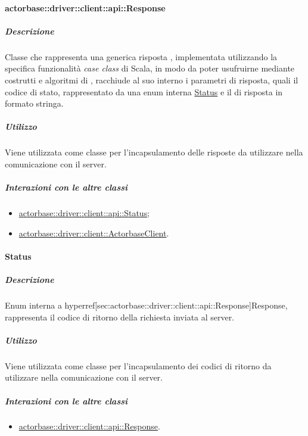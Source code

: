 \documentclass{scalatekids-article}
\begin{document}
\paragraph{actorbase::driver::client::api::Response}
\label{sec:actorbase::driver::client::api::Response}

\subparagraph{Descrizione}

Classe che rappresenta una generica risposta , implementata
utilizzando la specifica funzionalità \textit{case class} di Scala, in modo da
poter usufruirne mediante costrutti e algoritmi di ,
racchiude al suo interno i parametri di risposta, quali il codice di stato,
rappresentato da una enum interna
\hyperref[sec:actorbase::driver::client::api::Status]{Status} e il
 di risposta in formato stringa.

\subparagraph{Utilizzo}

Viene utilizzata come classe per l'incapsulamento delle risposte  da
utilizzare nella comunicazione con il server.

\subparagraph{Interazioni con le altre classi}

\begin{itemize}
\item \hyperref[sec:actorbase::driver::client::api::Status]{actorbase::driver::client::api::Status};
\item \hyperref[sec:actorbase::driver::client::ActorbaseClient]{actorbase::driver::client::ActorbaseClient}.
\end{itemize}


\paragraph{Status}
\label{sec:actorbase::driver::client::api::Status}

\subparagraph{Descrizione}

Enum interna a hyperref[sec:actorbase::driver::client::api::Response]{Response},
rappresenta il codice di ritorno della richiesta  inviata al server.

\subparagraph{Utilizzo}

Viene utilizzata come classe per l'incapsulamento dei codici di ritorno
 da utilizzare nella comunicazione con il server.

\subparagraph{Interazioni con le altre classi}

\begin{itemize}
\item \hyperref[sec:actorbase::driver::client::api::Response]{actorbase::driver::client::api::Response}.
\end{itemize}
\end{document}
